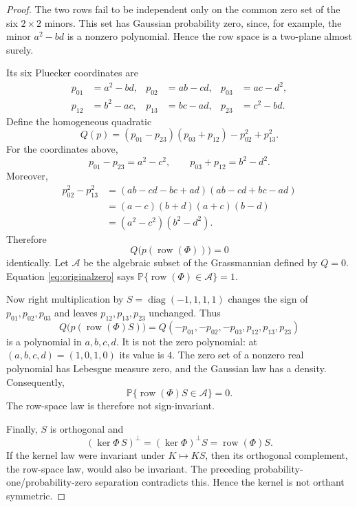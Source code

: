 \documentclass[11pt]{article}
\newcommand{\row}{\operatorname{row}}
\begin{document}
\begin{proof}
The two rows fail to be independent only on the common zero set of the six
$2\times2$ minors.  This set has Gaussian probability zero, since, for
example, the minor $a^2-bd$ is a nonzero polynomial.  Hence the row space is
a two-plane almost surely.

Its six Pluecker coordinates are
\begin{align*}
 p_{01}&=a^2-bd,& p_{02}&=ab-cd,& p_{03}&=ac-d^2,\\
 p_{12}&=b^2-ac,& p_{13}&=bc-ad,& p_{23}&=c^2-bd.
\end{align*}
Define the homogeneous quadratic
\begin{equation}\label{eq:Q}
 Q(p)=(p_{01}-p_{23})(p_{03}+p_{12})-p_{02}^2+p_{13}^2.
\end{equation}
For the coordinates above,
\[
 p_{01}-p_{23}=a^2-c^2,
 \qquad p_{03}+p_{12}=b^2-d^2.
\]
Moreover,
\begin{align*}
 p_{02}^2-p_{13}^2
 &=(ab-cd-bc+ad)(ab-cd+bc-ad)\\
 &=(a-c)(b+d)(a+c)(b-d)\\
 &=(a^2-c^2)(b^2-d^2).
\end{align*}
Therefore
\begin{equation}\label{eq:originalzero}
 Q\bigl(p(\row(\Phi))\bigr)=0
\end{equation}
identically.  Let $\mathcal A$ be the algebraic subset of the Grassmannian
defined by $Q=0$.  Equation \eqref{eq:originalzero} says
$\mathbb P\{\row(\Phi)\in\mathcal A\}=1$.

Now right multiplication by $S=\operatorname{diag}(-1,1,1,1)$ changes the
sign of $p_{01},p_{02},p_{03}$ and leaves $p_{12},p_{13},p_{23}$ unchanged.
Thus
\begin{equation}\label{eq:flippedpoly}
 Q\bigl(p(\row(\Phi)S)\bigr)
 =Q(-p_{01},-p_{02},-p_{03},p_{12},p_{13},p_{23})
\end{equation}
is a polynomial in $a,b,c,d$.  It is not the zero polynomial: at
$(a,b,c,d)=(1,0,1,0)$ its value is $4$.  The zero set of a nonzero real
polynomial has Lebesgue measure zero, and the Gaussian law has a density.
Consequently,
\[
 \mathbb P\{\row(\Phi)S\in\mathcal A\}=0.
\]
The row-space law is therefore not sign-invariant.

Finally, $S$ is orthogonal and
\[
 (\ker\Phi\,S)^\perp=(\ker\Phi)^\perp S=\row(\Phi)S.
\]
If the kernel law were invariant under $K\mapsto KS$, then its orthogonal
complement, the row-space law, would also be invariant.  The preceding
probability-one/probability-zero separation contradicts this.  Hence the
kernel is not orthant symmetric.
\end{proof}
\end{document}
